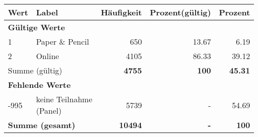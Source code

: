      \begin{longtable}{lXrrr}
     \toprule
     \textbf{Wert} & \textbf{Label} & \textbf{Häufigkeit} & \textbf{Prozent(gültig)} & \textbf{Prozent} \\
     \endhead
     \midrule
     \multicolumn{5}{l}{\textbf{Gültige Werte}}\\

     1 &
     \multicolumn{1}{X}{ Paper \& Pencil   } &


       \num{650} &
       \num[round-mode=places,round-precision=2]{13,67} &
         \num[round-mode=places,round-precision=2]{6,19} \\

     2 &
     \multicolumn{1}{X}{ Online   } &


       \num{4105} &
       \num[round-mode=places,round-precision=2]{86,33} &
         \num[round-mode=places,round-precision=2]{39,12} \\
     \midrule
     \multicolumn{2}{l}{Summe (gültig)} &
       \textbf{\num{4755}} &
     \textbf{100} &
       \textbf{\num[round-mode=places,round-precision=2]{45,31}} \\
     \multicolumn{5}{l}{\textbf{Fehlende Werte}}\\
       -995 &
       keine Teilnahme (Panel) &
         \num{5739} &
        - &
         \num[round-mode=places,round-precision=2]{54,69} \\
     \midrule
     \multicolumn{2}{l}{\textbf{Summe (gesamt)}} &
          \textbf{\num{10494}} &
        \textbf{-} &
        \textbf{100} \\
     \bottomrule
     \end{longtable}
     
